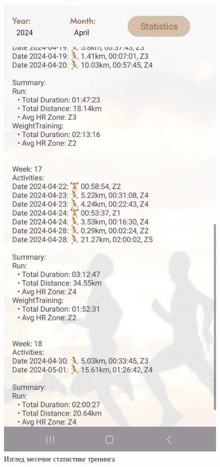 \documentclass[12pt,oneside]{memoir}
\begin{document}
\begin{figure}[h]
\begin{minipage}{0.45\textwidth}
  \end{minipage}
  \hfill
  \begin{minipage}{0.45\textwidth}
    \centering
    \includegraphics[scale=0.128]{assets/pictures/app_screenshots/training_stats_2.jpg}
  \end{minipage}
  \caption{Изглед месечне статистике тренинга}
  \label{pic:training_stats}
\end{figure}
\end{document}
